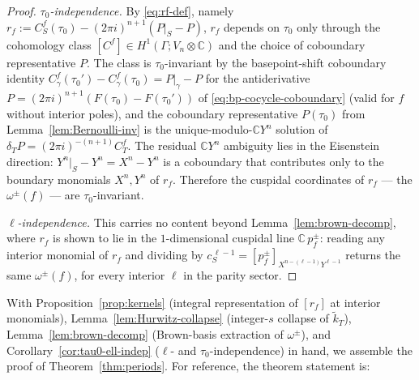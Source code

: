 \documentclass[11pt]{article}
\numberwithin{equation}{section}  %
\newcommand{\CC}{\mathbb{C}}
\begin{document}
\begin{proof}
\emph{$\tau_0$-independence.}  By \eqref{eq:rf-def}, namely
$r_f := C^f_S(\tau_0) - (2\pi i)^{n + 1}(P|_S - P)$,
$r_f$ depends on $\tau_0$ only through the cohomology class
$[C^f] \in H^1(\Gamma; V_n \otimes \CC)$ and the choice of coboundary
representative $P$.  The class is $\tau_0$-invariant by the
basepoint-shift coboundary identity
$C^f_\gamma(\tau_0') - C^f_\gamma(\tau_0) = P|_\gamma - P$ for the
antiderivative $P = (2\pi i)^{n + 1}(F(\tau_0) - F(\tau_0'))$ of
\eqref{eq:bp-cocycle-coboundary} (valid
for $f$ without interior poles), and the coboundary representative
$P(\tau_0)$ from Lemma~\ref{lem:Bernoulli-inv} is the
unique-modulo-$\CC Y^n$ solution of $\delta_T P = (2\pi i)^{-(n+1)} C^f_T$.
The residual $\CC Y^n$ ambiguity lies in the Eisenstein direction:
$Y^n|_S - Y^n = X^n - Y^n$ is a coboundary that contributes only to
the boundary monomials $X^n, Y^n$ of $r_f$.  Therefore the cuspidal
coordinates of $r_f$ --- the $\omega^\pm(f)$ --- are $\tau_0$-invariant.

\emph{$\ell$-independence.}  This carries no content beyond
Lemma~\ref{lem:brown-decomp}, where $r_f$ is shown to lie in the
$1$-dimensional cuspidal line $\CC\,p^\pm_f$: reading any interior
monomial of $r_f$ and dividing by
$c_S^{\,\ell - 1} = [p^\pm_f]_{X^{n - (\ell - 1)} Y^{\ell - 1}}$ returns
the same $\omega^\pm(f)$, for every interior $\ell$ in the parity sector.
\end{proof}

With Proposition~\ref{prop:kernels} (integral representation of
$[r_f]$ at interior monomials), Lemma~\ref{lem:Hurwitz-collapse}
(integer-$s$ collapse of $\widetilde{k}_T$), Lemma~\ref{lem:brown-decomp}
(Brown-basis extraction of $\omega^\pm$), and Corollary~\ref{cor:tau0-ell-indep}
($\ell$- and $\tau_0$-independence) in hand, we assemble the proof of
Theorem~\ref{thm:periods}.  For reference, the theorem statement is:
\end{document}
